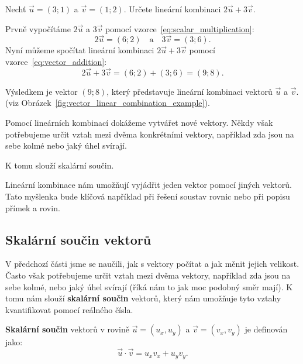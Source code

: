 \begin{example}
    Nechť $\vec{u} = (3;1)$ a $\vec{v} = (1;2)$.
    Určete lineární kombinaci $2\vec{u} + 3\vec{v}$.

    Prvně vypočítáme $2\vec{u}$ a $3\vec{v}$ pomocí vzorce~\eqref{eq:scalar_multiplication}:
    \[
    2\vec{u} = (6;2) \quad \text{a} \quad 3\vec{v} = (3;6).
    \]
    Nyní můžeme spočítat lineární kombinaci $2\vec{u} + 3\vec{v}$ pomocí vzorce~\eqref{eq:vector_addition}:    
    \[
    2\vec{u} + 3\vec{v} = (6;2) + (3;6) = (9;8).
    \]
    
    Výsledkem je vektor $(9;8)$, který představuje lineární kombinaci vektorů $\vec{u}$ a $\vec{v}$. (viz Obrázek~\ref{fig:vector_linear_combination_example}).
\end{example}

Pomocí lineárních kombinací dokážeme vytvářet nové vektory.
Někdy však potřebujeme určit vztah mezi dvěma konkrétními vektory,
například zda jsou na sebe kolmé nebo jaký úhel svírají.

K tomu slouží skalární součin.

\begin{remark}
Lineární kombinace nám umožňují vyjádřit jeden vektor pomocí jiných vektorů.
Tato myšlenka bude klíčová například při řešení soustav rovnic nebo při popisu přímek a rovin.
\end{remark}


\subsection{Skalární součin vektorů}\label{subsec:Dot_product_of_vectors}

V předchozí části jsme se naučili, jak s vektory počítat a jak měnit jejich velikost.
Často však potřebujeme určit vztah mezi dvěma vektory, například zda jsou na sebe kolmé,
nebo jaký úhel svírají (říká nám to jak moc podobný směr mají).
K tomu nám slouží \textbf{skalární součin} vektorů, 
který nám umožňuje tyto vztahy kvantifikovat pomocí reálného čísla.

\begin{definition}\label{def:dot_product_geometric}
    \textbf{Skalární součin} vektorů v rovině $\vec{u} = (u_x, u_y)$ a $\vec{v} = (v_x, v_y)$ je definován jako:
    \begin{equation}\label{eq:dot_product_geometric}
        \vec{u} \cdot \vec{v} = u_x v_x + u_y v_y.
    \end{equation}
\end{definition}

